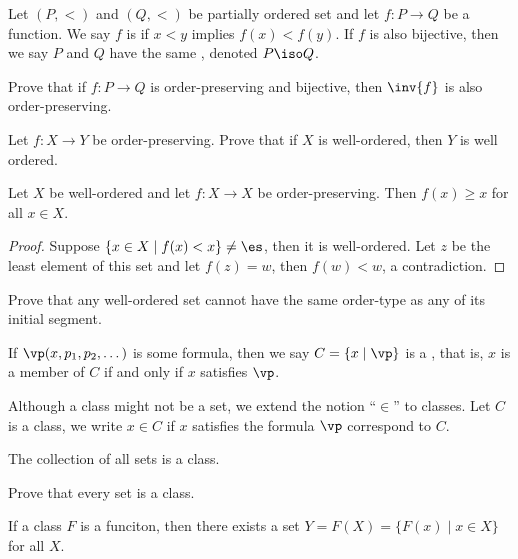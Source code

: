 \documentclass[10pt]{article}
\begin{document}
\begin{definition}
    Let $(P,<)$ and $(Q,<)$ be partially ordered set and let $f:P\to Q$ be a function. We say $f$ is  if $x<y$ implies $f(x)<f(y)$. If $f$ is also bijective, then we say $P$ and $Q$ have the same , denoted $P\iso Q$.
\end{definition}
\begin{problem}
    Prove that if $f:P\to Q$ is order-preserving and bijective, then $\inv{f}$ is also order-preserving.
\end{problem}
\begin{problem}
    Let $f:X\to Y$ be order-preserving. Prove that if $X$ is well-ordered, then $Y$ is well ordered.
\end{problem}
\begin{proposition}
    Let $X$ be well-ordered and let $f:X\to X$ be order-preserving. Then $f(x)\ge x$ for all $x\in X$.
\end{proposition}
\begin{proof}
    Suppose $\{x\in X\mid f(x)<x\}\ne\es$, then it is well-ordered. Let $z$ be the least element of this set and let $f(z)=w$, then $f(w)<w$, a contradiction.
\end{proof}
\begin{problem}
    Prove that any well-ordered set cannot have the same order-type as any of its initial segment.
\end{problem}
\begin{definition}
    If $\vp(x,{p}_{1},{p}_{2},\dots)$ is some formula, then we say $C=\{x\mid\vp\}$ is a , that is, $x$ is a member of $C$ if and only if $x$ satisfies $\vp$.
\end{definition}
\begin{remark}
    Although a class might not be a set, we extend the notion ``$\in$'' to classes. Let $C$ is a class, we write $x\in C$ if $x$ satisfies the formula $\vp$ correspond to $C$.
\end{remark}
\begin{example}
    The collection of all sets is a class.
\end{example}
\begin{problem}
    Prove that every set is a class.
\end{problem}
\begin{Axiom schema of replacement}
    If a class $F$ is a funciton, then there exists a set $Y=F(X)=\{F(x)\mid x\in X\}$ for all $X$.
\end{Axiom schema of replacement}
\end{document}
